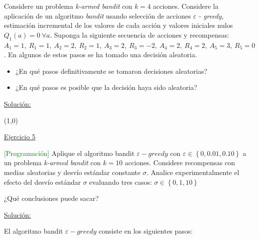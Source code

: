 \documentclass[12pt]{article}
\newlength\tindent
\renewcommand{\indent}{\hspace*{\tindent}}
\begin{document}
    Considere un problema \textit{k-armed bandit} con $k = 4$ acciones.
    Considere la aplicación de un algoritmo \textit{bandit} usando selección de acciones $\varepsilon$ \textit{- greedy}, estimación incremental de los valores de cada acción y valores iniciales nulos $Q_{1}(a) = 0\ \forall a$.
    Suponga la siguiente secuencia de acciones y recompensas: $A_{1}=1,\ R_{1}=1,\ A_{2}=2,\ R_{2}=1,\ A_{3}=2,\ R_{3}=-2,\ A_{4}=2,\ R_{4}=2,\ A_{5}=3,\ R_{5}=0$.
    En algunos de estos pasos se ha tomado una decisión aleatoria.

    \begin{itemize}
        \item ¿En qué pasos definitivamente se tomaron decisiones aleatorias?
        \item ¿En qué pasos es posible que la decisión haya sido aleatoria?
    \end{itemize}

    \indent\underline{Solución:}

    \lipsum[10]

    \line(1,0){\textwidth}


    \indent\underline{Ejercicio 5}

    \textcolor{green}{[Programación]} Aplique el algoritmo bandit $\varepsilon-greedy$ con $\varepsilon \in \left\{ 0, 0.01, 0.10 \right\}$ a un problema \textit{k-armed bandit} con $k=10$ acciones.
    Considere recompensas con medias aleatorias y desvío estándar constante $\sigma$.
    Analice experimentalmente el efecto del desvío estándar $\sigma$ evaluando tres casos: $\sigma \in \left\{ 0, 1, 10 \right\}$

    ¿Qué conclusiones puede sacar?

    \indent\underline{Solución:}

    El algoritmo bandit $\varepsilon-greedy$ consiste en los siguientes pasos:
\end{document}
